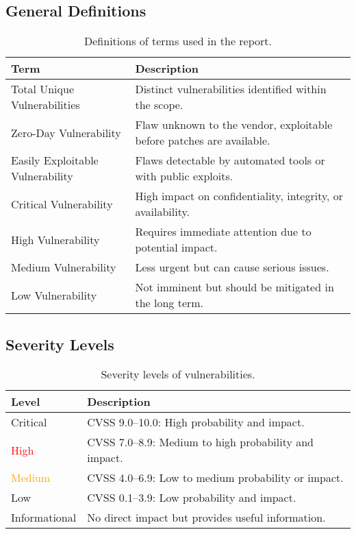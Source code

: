 \documentclass[a4paper,12pt]{article}
\begin{document}
\subsection{General Definitions}
\begin{table}[ht]
    \centering
    \begin{tabular}{lp{8cm}}
        \toprule
        \rowcolor{gray!20} \textbf{Term} & \textbf{Description} \\
        \midrule
        Total Unique Vulnerabilities & Distinct vulnerabilities identified within the scope. \\ \hline
        Zero-Day Vulnerability & Flaw unknown to the vendor, exploitable before patches are available. \\ \hline
        Easily Exploitable Vulnerability & Flaws detectable by automated tools or with public exploits. \\ \hline
        Critical Vulnerability & High impact on confidentiality, integrity, or availability. \\ \hline
        High Vulnerability & Requires immediate attention due to potential impact. \\ \hline
        Medium Vulnerability & Less urgent but can cause serious issues. \\ \hline
        Low Vulnerability & Not imminent but should be mitigated in the long term. \\
        \bottomrule
    \end{tabular}
    \caption{Definitions of terms used in the report.}
\end{table}

\clearpage

\subsection{Severity Levels}
\begin{table}[ht]
    \centering
    \begin{tabular}{lp{10cm}}
        \toprule
        \rowcolor{gray!20} \textbf{Level} & \textbf{Description} \\
        \midrule
        \textcolor{BrickRed}{Critical} & CVSS 9.0–10.0: High probability and impact. \\
        \textcolor{Red}{High} & CVSS 7.0–8.9: Medium to high probability and impact. \\
        \textcolor{Orange}{Medium} & CVSS 4.0–6.9: Low to medium probability or impact. \\
        \textcolor{NavyBlue}{Low} & CVSS 0.1–3.9: Low probability and impact. \\
        \textcolor{Periwinkle}{Informational} & No direct impact but provides useful information. \\
        \bottomrule
    \end{tabular}
    \caption{Severity levels of vulnerabilities.}
\end{table}
\end{document}
